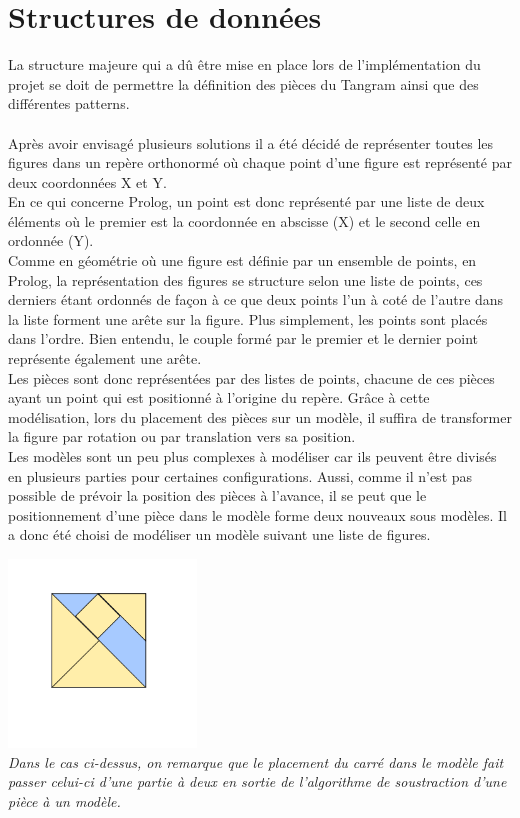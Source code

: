 \documentclass[a4paper, 11pt]{report}
\begin{document}
	    \section{Structures de données}

        La structure majeure qui a dû être mise en place lors de l'implémentation du projet se doit de permettre la définition des pièces du Tangram ainsi que des différentes patterns.\\ \ \\ 
        
        Après avoir envisagé plusieurs solutions il a été décidé de représenter toutes les figures dans un repère orthonormé où chaque point d'une figure est représenté par deux coordonnées X et Y. \\
        En ce qui concerne Prolog, un point est donc représenté par une liste de deux éléments où le premier est la coordonnée en abscisse (X) et le second celle en ordonnée (Y).\\
		Comme en géométrie où une figure est définie par un ensemble de points, en Prolog, la représentation des figures se structure selon une liste de points, ces derniers étant ordonnés de façon à ce que deux points l'un à coté de l'autre dans la liste forment une arête sur la figure. Plus simplement, les points sont placés dans l'ordre. Bien entendu, le couple formé par le premier et le dernier point représente également une arête.\\
		Les pièces sont donc représentées par des listes de points, chacune de ces pièces ayant un point qui est positionné à l'origine du repère. Grâce à cette modélisation, lors du placement des pièces sur un modèle, il suffira de transformer la figure par rotation ou par translation vers sa position.\\
		Les modèles sont un peu plus complexes à modéliser car ils peuvent être divisés en plusieurs parties pour certaines configurations. Aussi, comme il n'est pas possible de prévoir la position des pièces à l'avance, il se peut que le positionnement d'une pièce dans le modèle forme deux nouveaux sous modèles. Il a donc été choisi de modéliser un modèle suivant une liste de figures. 
		
		\vspace*{1cm}

        \begin{center}
            \includegraphics[width=5cm]{representation_sousfigure}\\
            \emph{Dans le cas ci-dessus, on remarque que le placement du carré dans le modèle fait passer celui-ci d'une partie à deux en sortie de l'algorithme de soustraction d'une pièce à un modèle.}
        \end{center}
        
\end{document}
